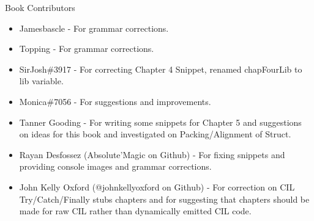\large Book Contributors \newline
\begin{itemize}
	\item Jamesbascle - For grammar corrections.
	\item Topping - For grammar corrections.
	\item SirJosh\#3917 - For correcting Chapter 4 Snippet, renamed chapFourLib to lib variable.
	\item Monica\#7056 - For suggestions and improvements.
	\item Tanner Gooding - For writing some snippets for Chapter 5 and suggestions on ideas for this book and investigated on Packing/Alignment of Struct.
	\item Rayan Desfossez (Absolute'Magic on Github) - For fixing snippets and providing console images and grammar corrections.
	\item John Kelly Oxford (@johnkellyoxford on Github) - For correction on CIL Try/Catch/Finally stubs chapters and for suggesting that chapters should be made for raw CIL rather than dynamically emitted CIL code.
\end{itemize}

\newpage
